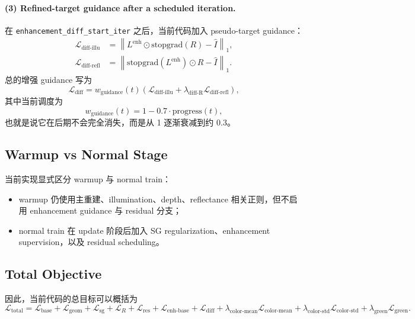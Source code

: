 \documentclass[11pt]{article}
\begin{document}
\paragraph{(3) Refined-target guidance after a scheduled iteration.}
在 \verb|enhancement_diff_start_iter| 之后，当前代码加入 pseudo-target guidance：
\begin{align}
    \mathcal{L}_{\text{diff-illu}}
    &=
    \left\|
        L^{\text{enh}} \odot \mathrm{stopgrad}(R) - \hat{I}
    \right\|_1, \\
    \mathcal{L}_{\text{diff-refl}}
    &=
    \left\|
        \mathrm{stopgrad}(L^{\text{enh}}) \odot R - \hat{I}
    \right\|_1.
\end{align}
总的增强 guidance 写为
\begin{equation}
    \mathcal{L}_{\text{diff}}
    =
    w_{\text{guidance}}(t)
    \left(
        \mathcal{L}_{\text{diff-illu}}
        +
        \lambda_{\text{diff-R}}\mathcal{L}_{\text{diff-refl}}
    \right),
\end{equation}
其中当前调度为
\begin{equation}
    w_{\text{guidance}}(t) = 1 - 0.7 \cdot \mathrm{progress}(t),
\end{equation}
也就是说它在后期不会完全消失，而是从 1 逐渐衰减到约 0.3。

\subsection{Warmup vs Normal Stage}

当前实现显式区分 warmup 与 normal train：
\begin{itemize}[leftmargin=1.5em]
    \item warmup 仍使用主重建、illumination、depth、reflectance 相关正则，但不启用 enhancement guidance 与 residual 分支；
    \item normal train 在 update 阶段后加入 SG regularization、enhancement supervision，以及 residual scheduling。
\end{itemize}

\subsection{Total Objective}

因此，当前代码的总目标可以概括为
\begin{equation}
    \mathcal{L}_{\text{total}}
    =
    \mathcal{L}_{\text{base}}
    +
    \mathcal{L}_{\text{geom}}
    +
    \mathcal{L}_{\text{sg}}
    +
    \mathcal{L}_{R}
    +
    \mathcal{L}_{\text{res}}
    +
    \mathcal{L}_{\text{enh-base}}
    +
    \mathcal{L}_{\text{diff}}
    +
    \lambda_{\text{color-mean}}\mathcal{L}_{\text{color-mean}}
    +
    \lambda_{\text{color-std}}\mathcal{L}_{\text{color-std}}
    +
    \lambda_{\text{green}}\mathcal{L}_{\text{green}}.
\end{equation}
\end{document}
